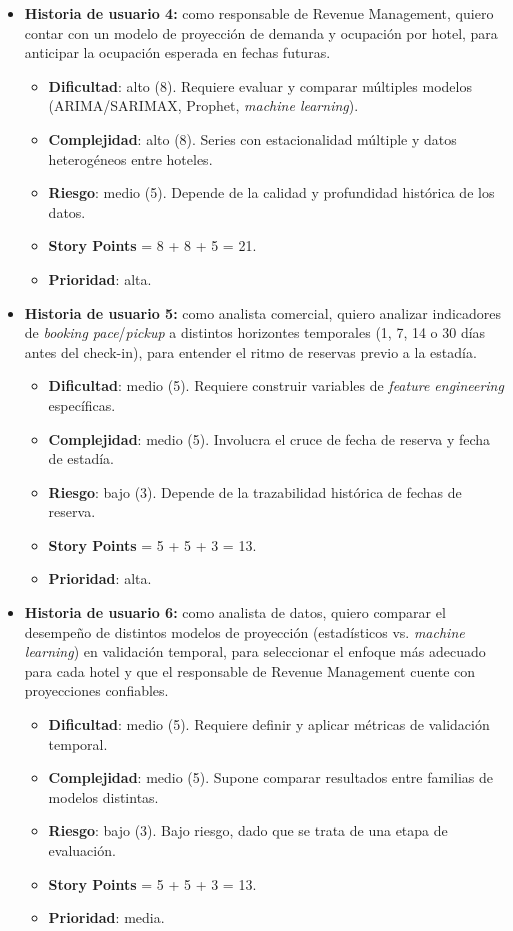 \documentclass[
11pt, %
]{charter}
\begin{document}
\begin{itemize}
  \item \textbf{Historia de usuario 4:} como responsable de Revenue Management, quiero contar con un modelo de proyección de demanda y ocupación por hotel, para anticipar la ocupación esperada en fechas futuras.
    \begin{itemize}
      \item \textbf{Dificultad}: alto (8). Requiere evaluar y comparar múltiples modelos (ARIMA/SARIMAX, Prophet, \textit{machine learning}).
      \item \textbf{Complejidad}: alto (8). Series con estacionalidad múltiple y datos heterogéneos entre hoteles.
      \item \textbf{Riesgo}: medio (5). Depende de la calidad y profundidad histórica de los datos.
      \item \textbf{Story Points} = 8 + 8 + 5 = 21.
      \item \textbf{Prioridad}: alta.
    \end{itemize}
  \item \textbf{Historia de usuario 5:} como analista comercial, quiero analizar indicadores de \textit{booking pace}/\textit{pickup} a distintos horizontes temporales (1, 7, 14 o 30 días antes del check-in), para entender el ritmo de reservas previo a la estadía.
    \begin{itemize}
      \item \textbf{Dificultad}: medio (5). Requiere construir variables de \textit{feature engineering} específicas.
      \item \textbf{Complejidad}: medio (5). Involucra el cruce de fecha de reserva y fecha de estadía.
      \item \textbf{Riesgo}: bajo (3). Depende de la trazabilidad histórica de fechas de reserva.
      \item \textbf{Story Points} = 5 + 5 + 3 = 13.
      \item \textbf{Prioridad}: alta.
    \end{itemize}
    \item \textbf{Historia de usuario 6:} como analista de datos, quiero comparar el desempeño de distintos modelos de proyección (estadísticos vs. \textit{machine learning}) en validación temporal, para seleccionar el enfoque más adecuado para cada hotel y que el responsable de Revenue Management cuente con proyecciones confiables.
    \begin{itemize}
      \item \textbf{Dificultad}: medio (5). Requiere definir y aplicar métricas de validación temporal.
      \item \textbf{Complejidad}: medio (5). Supone comparar resultados entre familias de modelos distintas.
      \item \textbf{Riesgo}: bajo (3). Bajo riesgo, dado que se trata de una etapa de evaluación.
      \item \textbf{Story Points} = 5 + 5 + 3 = 13.
      \item \textbf{Prioridad}: media.
    \end{itemize}
\end{itemize}
\end{document}
